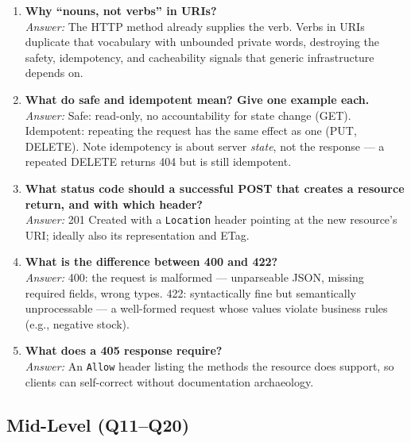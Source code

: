 \begin{enumerate}[label=\textbf{Q\arabic*.}, leftmargin=3.2em, itemsep=0.6em]
  \item \textbf{Why ``nouns, not verbs'' in URIs?}\\
        \emph{Answer:} The HTTP method already supplies the verb. Verbs in URIs
        duplicate that vocabulary with unbounded private words, destroying the
        safety, idempotency, and cacheability signals that generic
        infrastructure depends on.
  \item \textbf{What do safe and idempotent mean? Give one example each.}\\
        \emph{Answer:} Safe: read-only, no accountability for state change
        (GET). Idempotent: repeating the request has the same effect as one
        (PUT, DELETE). Note idempotency is about server \emph{state}, not the
        response --- a repeated DELETE returns 404 but is still idempotent.
  \item \textbf{What status code should a successful POST that creates a
        resource return, and with which header?}\\
        \emph{Answer:} 201 Created with a \texttt{Location} header pointing at
        the new resource's URI; ideally also its representation and ETag.
  \item \textbf{What is the difference between 400 and 422?}\\
        \emph{Answer:} 400: the request is malformed --- unparseable JSON,
        missing required fields, wrong types. 422: syntactically fine but
        semantically unprocessable --- a well-formed request whose values
        violate business rules (e.g., negative stock).
  \item \textbf{What does a 405 response require?}\\
        \emph{Answer:} An \texttt{Allow} header listing the methods the
        resource does support, so clients can self-correct without
        documentation archaeology.
\end{enumerate}

\subsection{Mid-Level (Q11--Q20)}

